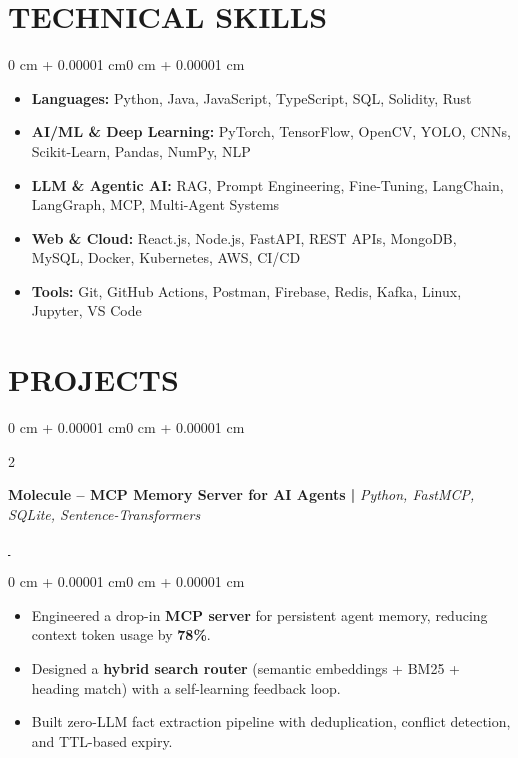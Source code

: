 \documentclass[1pt, letterpaper]{article}
\newenvironment{onecolentry}{
    \begin{adjustwidth}{0 cm + 0.00001 cm}{0 cm + 0.00001 cm}
}{
    \end{adjustwidth}
}
\newenvironment{twocolentry}[2][]{
    \onecolentry
    \def\secondColumn{#2}
    \setcolumnwidth{\fill, 4.5 cm}
    \begin{paracol}{2}
}{
    \switchcolumn \raggedleft \secondColumn
    \end{paracol}
    \endonecolentry
}
\let\hrefWithoutArrow\href
\begin{document}
    \section{TECHNICAL SKILLS}
    \begin{onecolentry}
        \begin{itemize}
            \item \textbf{Languages:} Python, Java, JavaScript, TypeScript, SQL, Solidity, Rust \vspace{-2pt}
            \item \textbf{AI/ML \& Deep Learning:} PyTorch, TensorFlow, OpenCV, YOLO, CNNs, Scikit-Learn, Pandas, NumPy, NLP \vspace{-2pt}
            \item \textbf{LLM \& Agentic AI:} RAG, Prompt Engineering, Fine-Tuning, LangChain, LangGraph, MCP, Multi-Agent Systems \vspace{-2pt}
            \item \textbf{Web \& Cloud:} React.js, Node.js, FastAPI, REST APIs, MongoDB, MySQL, Docker, Kubernetes, AWS, CI/CD \vspace{-2pt}
            \item \textbf{Tools:} Git, GitHub Actions, Postman, Firebase, Redis, Kafka, Linux, Jupyter, VS Code \vspace{-2pt}
        \end{itemize}
    \end{onecolentry}

    \vspace{-1pt}

    \section{PROJECTS}
    \vspace{1pt}

    \begin{twocolentry}{
        {\hrefWithoutArrow{https://github.com/madhesh60/molecule}{\,\faExternalLink*}}%
    }
        \vspace{-3pt}
        \textbf{Molecule -- MCP Memory Server for AI Agents |}
        \textit{Python, FastMCP, SQLite, Sentence-Transformers}
    \end{twocolentry}
    \begin{onecolentry}
        \vspace{0mm}
        \begin{itemize}
            \item Engineered a drop-in \textbf{MCP server} for persistent agent memory, reducing context token usage by \textbf{78\%}.
            \item Designed a \textbf{hybrid search router} (semantic embeddings + BM25 + heading match) with a self-learning feedback loop.
            \item Built zero-LLM fact extraction pipeline with deduplication, conflict detection, and TTL-based expiry.
        \end{itemize}
    \end{onecolentry}
    \vspace{0.8mm}
\end{document}
